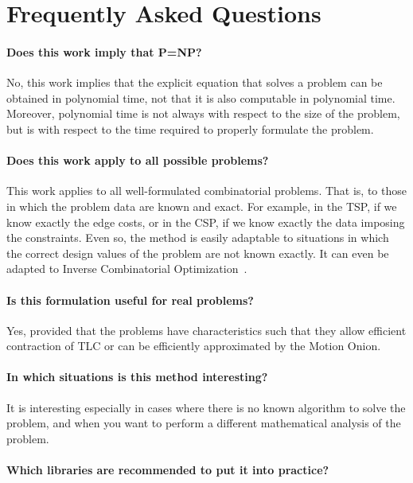 
\section{Frequently Asked Questions}

\paragraph{Does this work imply that P=NP?}

No, this work implies that the explicit equation that solves a problem can be obtained in polynomial time, not that it is also computable in polynomial time. Moreover, polynomial time is not always with respect to the size of the problem, but is with respect to the time required to properly formulate the problem.

\paragraph{Does this work apply to all possible problems?}

This work applies to all well-formulated combinatorial problems. That is, to those in which the problem data are known and exact. For example, in the TSP, if we know exactly the edge costs, or in the CSP, if we know exactly the data imposing the constraints. Even so, the method is easily adaptable to situations in which the correct design values of the problem are not known exactly. It can even be adapted to Inverse Combinatorial Optimization~\cite{Inverse_comb}.

\paragraph{Is this formulation useful for real problems?}

Yes, provided that the problems have characteristics such that they allow efficient contraction of TLC or can be efficiently approximated by the Motion Onion.

\paragraph{In which situations is this method interesting?}

It is interesting especially in cases where there is no known algorithm to solve the problem, and when you want to perform a different mathematical analysis of the problem.

\paragraph{Which libraries are recommended to put it into practice?}

